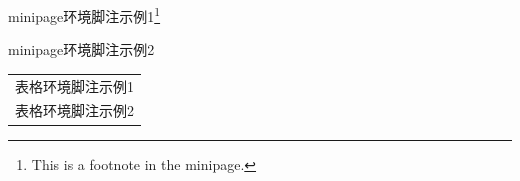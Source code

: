 \documentclass{ctexart}
\begin{document}
            \begin{minipage}{\linewidth}
                minipage环境脚注示例1\footnote{This is a footnote in the minipage.} %

                minipage环境脚注示例2\footnotemark %
            \end{minipage}

            \begin{tabular}{l}
                表格环境脚注示例1\footnotemark\\
                表格环境脚注示例2\footnotemark
            \end{tabular}
            


            
            
\end{document}
